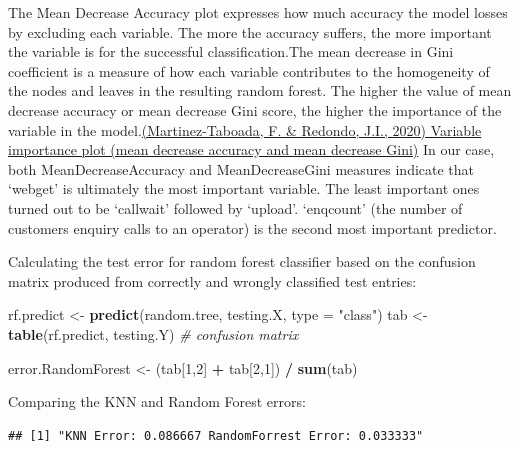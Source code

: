 \documentclass[
]{article}
\newenvironment{Shaded}{\begin{snugshade}}{\end{snugshade}}
\newcommand{\CommentTok}[1]{\textcolor[rgb]{0.56,0.35,0.01}{\textit{#1}}}
\newcommand{\DataTypeTok}[1]{\textcolor[rgb]{0.13,0.29,0.53}{#1}}
\newcommand{\DecValTok}[1]{\textcolor[rgb]{0.00,0.00,0.81}{#1}}
\newcommand{\KeywordTok}[1]{\textcolor[rgb]{0.13,0.29,0.53}{\textbf{#1}}}
\newcommand{\NormalTok}[1]{#1}
\newcommand{\OperatorTok}[1]{\textcolor[rgb]{0.81,0.36,0.00}{\textbf{#1}}}
\newcommand{\StringTok}[1]{\textcolor[rgb]{0.31,0.60,0.02}{#1}}
\begin{document}
The Mean Decrease Accuracy plot expresses how much accuracy the model
losses by excluding each variable. The more the accuracy suffers, the
more important the variable is for the successful classification.The
mean decrease in Gini coefficient is a measure of how each variable
contributes to the homogeneity of the nodes and leaves in the resulting
random forest. The higher the value of mean decrease accuracy or mean
decrease Gini score, the higher the importance of the variable in the
model.\href{https://doi.org/10.1371/journal.pone.0230799.g002}{(Martinez-Taboada,
F. \& Redondo, J.I., 2020) Variable importance plot (mean decrease
accuracy and mean decrease Gini)} In our case, both MeanDecreaseAccuracy
and MeanDecreaseGini measures indicate that `webget' is ultimately the
most important variable. The least important ones turned out to be
`callwait' followed by `upload'. `enqcount' (the number of customers
enquiry calls to an operator) is the second most important predictor.

Calculating the test error for random forest classifier based on the
confusion matrix produced from correctly and wrongly classified test
entries:

\begin{Shaded}
\begin{Highlighting}[]
\NormalTok{rf.predict <-}\StringTok{ }\KeywordTok{predict}\NormalTok{(random.tree, testing.X, }\DataTypeTok{type =} \StringTok{"class"}\NormalTok{)}
\NormalTok{tab <-}\StringTok{ }\KeywordTok{table}\NormalTok{(rf.predict, testing.Y) }\CommentTok{# confusion matrix}

\NormalTok{error.RandomForest <-}\StringTok{ }\NormalTok{(tab[}\DecValTok{1}\NormalTok{,}\DecValTok{2}\NormalTok{] }\OperatorTok{+}\StringTok{ }\NormalTok{tab[}\DecValTok{2}\NormalTok{,}\DecValTok{1}\NormalTok{]) }\OperatorTok{/}\StringTok{ }\KeywordTok{sum}\NormalTok{(tab)}
\end{Highlighting}
\end{Shaded}

Comparing the KNN and Random Forest errors:

\begin{Shaded}
\end{Shaded}

\begin{verbatim}
## [1] "KNN Error: 0.086667 RandomForrest Error: 0.033333"
\end{verbatim}
\end{document}
